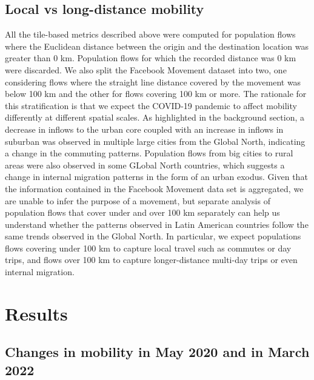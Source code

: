 \documentclass[
  10pt,
  letterpaper,
  DIV=11,
  numbers=noendperiod]{scrartcl}
\begin{document}
\hypertarget{local-vs-long-distance-mobility}{%
\subsection{Local vs long-distance
mobility}\label{local-vs-long-distance-mobility}}

All the tile-based metrics described above were computed for population
flows where the Euclidean distance between the origin and the
destination location was greater than 0 km. Population flows for which
the recorded distance was 0 km were discarded. We also split the
Facebook Movement dataset into two, one considering flows where the
straight line distance covered by the movement was below 100 km and the
other for flows covering 100 km or more. The rationale for this
stratification is that we expect the COVID-19 pandemic to affect
mobility differently at different spatial scales. As highlighted in the
background section, a decrease in inflows to the urban core coupled with
an increase in inflows in suburban was observed in multiple large cities
from the Global North, indicating a change in the commuting patterns.
Population flows from big cities to rural areas were also observed in
some GLobal North countries, which suggests a change in internal
migration patterns in the form of an urban exodus. Given that the
information contained in the Facebook Movement data set is aggregated,
we are unable to infer the purpose of a movement, but separate analysis
of population flows that cover under and over 100 km separately can help
us understand whether the patterns observed in Latin American countries
follow the same trends observed in the Global North. In particular, we
expect populations flows covering under 100 km to capture local travel
such as commutes or day trips, and flows over 100 km to capture
longer-distance multi-day trips or even internal migration.

\hypertarget{results}{%
\section{Results}\label{results}}

\hypertarget{changes-in-mobility-in-may-2020-and-in-march-2022}{%
\subsection{Changes in mobility in May 2020 and in March
2022}\label{changes-in-mobility-in-may-2020-and-in-march-2022}}
\end{document}
